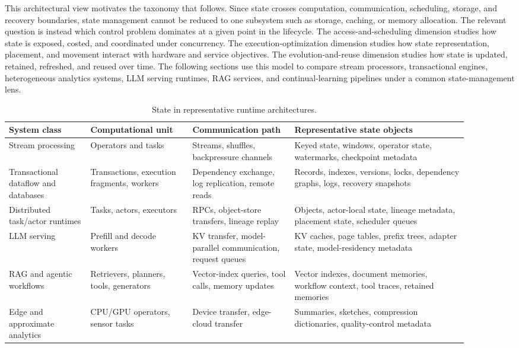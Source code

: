 \documentclass[acmsmall,screen,review]{acmart}
\begin{document}
This architectural view motivates the taxonomy that follows. Since state crosses computation, communication, scheduling, storage, and recovery boundaries, state management cannot be reduced to one subsystem such as storage, caching, or memory allocation. The relevant question is instead which control problem dominates at a given point in the lifecycle. The access-and-scheduling dimension studies how state is exposed, costed, and coordinated under concurrency. The execution-optimization dimension studies how state representation, placement, and movement interact with hardware and service objectives. The evolution-and-reuse dimension studies how state is updated, retained, refreshed, and reused over time. The following sections use this model to compare stream processors, transactional engines, heterogeneous analytics systems, LLM serving runtimes, RAG services, and continual-learning pipelines under a common state-management lens.

\begin{table}[t]
\centering
\caption{State in representative runtime architectures.}
\label{tab:state-system-model}
\begin{tabular}{p{0.16\linewidth}p{0.20\linewidth}p{0.20\linewidth}p{0.34\linewidth}}
\toprule
System class & Computational unit & Communication path & Representative state objects \\
\midrule
Stream processing & Operators and tasks & Streams, shuffles, backpressure channels & Keyed state, windows, operator state, watermarks, checkpoint metadata \\
Transactional dataflow and databases & Transactions, execution fragments, workers & Dependency exchange, log replication, remote reads & Records, indexes, versions, locks, dependency graphs, logs, recovery snapshots \\
Distributed task/actor runtimes & Tasks, actors, executors & RPCs, object-store transfers, lineage replay & Objects, actor-local state, lineage metadata, placement state, scheduler queues \\
LLM serving & Prefill and decode workers & KV transfer, model-parallel communication, request queues & KV caches, page tables, prefix trees, adapter state, model-residency metadata \\
RAG and agentic workflows & Retrievers, planners, tools, generators & Vector-index queries, tool calls, memory updates & Vector indexes, document memories, workflow context, tool traces, retained memories \\
Edge and approximate analytics & CPU/GPU operators, sensor tasks & Device transfer, edge-cloud transfer & Summaries, sketches, compression dictionaries, quality-control metadata \\
\bottomrule
\end{tabular}
\end{table}
\end{document}
